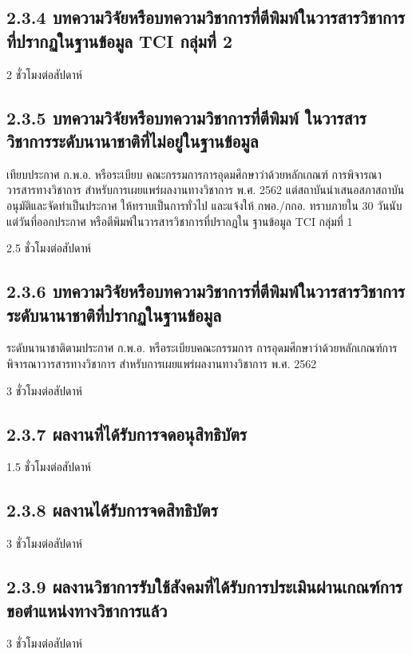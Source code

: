 \documentclass[a4paper,12pt,english]{sphinxmanual}
\begin{document}
\subsection{2.3.4 บทความวิจัยหรือบทความวิชาการที่ตีพิมพ์ในวารสารวิชาการที่ปรากฏในฐานข้อมูล TCI กลุ่มที่ 2}
\label{\detokenize{2research:tci-2}}
2 ชั่วโมงต่อสัปดาห์


\subsection{2.3.5 บทความวิจัยหรือบทความวิชาการที่ตีพิมพ์ ในวารสารวิชาการระดับนานาชาติที่ไม่อยู่ในฐานข้อมูล}
\label{\detokenize{2research:id15}}
เทียบประกาศ ก.พ.อ. หรือระเบียบ คณะกรรมการการอุดมศึกษาว่าด้วยหลักเกณฑ์ การพิจารณาวารสารทางวิชาการ สำหรับการเผยแพร่ผลงานทางวิชาการ พ.ศ. 2562 แต่สถาบันนำเสนอสภาสถาบันอนุมัติและจัดทำเป็นประกาศ ให้ทราบเป็นการทั่วไป และแจ้งให้ กพอ./กกอ. ทราบภายใน 30 วันนับแต่วันที่ออกประกาศ หรือตีพิมพ์ในวารสารวิชาการที่ปรากฏใน ฐานข้อมูล TCI กลุ่มที่ 1

2.5 ชั่วโมงต่อสัปดาห์


\subsection{2.3.6 บทความวิจัยหรือบทความวิชาการที่ตีพิมพ์ในวารสารวิชาการระดับนานาชาติที่ปรากฏในฐานข้อมูล}
\label{\detokenize{2research:id16}}
ระดับนานาชาติตามประกาศ ก.พ.อ. หรือระเบียบคณะกรรมการ การอุดมศึกษาว่าด้วยหลักเกณฑ์การพิจารณาวารสารทางวิชาการ สำหรับการเผยแพร่ผลงานทางวิชาการ พ.ศ. 2562

3 ชั่วโมงต่อสัปดาห์


\subsection{2.3.7 ผลงานที่ได้รับการจดอนุสิทธิบัตร}
\label{\detokenize{2research:id17}}
1.5 ชั่วโมงต่อสัปดาห์


\subsection{2.3.8 ผลงานได้รับการจดสิทธิบัตร}
\label{\detokenize{2research:id18}}
3 ชั่วโมงต่อสัปดาห์


\subsection{2.3.9 ผลงานวิชาการรับใช้สังคมที่ได้รับการประเมินผ่านเกณฑ์การขอตำแหน่งทางวิชาการแล้ว}
\label{\detokenize{2research:id19}}
3 ชั่วโมงต่อสัปดาห์
\end{document}
